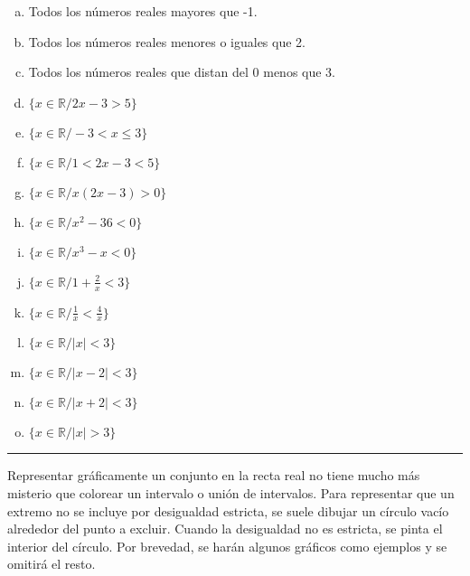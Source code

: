 \documentclass{article}
\begin{document}
\begin{enumerate}[(a)]

\bfseries

\item Todos los números reales mayores que -1.

\item Todos los números reales menores o iguales que 2.

\item Todos los números reales que distan del 0 menos que 3.

\item $ \{ x \in \mathbb{R} / 2x - 3 > 5 \} $

\item $ \{ x \in \mathbb{R} / -3 < x \leq 3 \} $

\item $ \{ x \in \mathbb{R} / 1 < 2x-3 < 5 \} $

\item $ \{ x \in \mathbb{R} / x(2x-3) > 0 \} $

\item $ \{ x \in \mathbb{R} / x^2 - 36 < 0 \} $

\item $ \{ x \in \mathbb{R} / x^3 - x < 0 \} $

\item $ \{ x \in \mathbb{R} / 1 + \frac{2}{x} < 3 \} $

\item $ \{ x \in \mathbb{R} / \frac{1}{x} < \frac{4}{x} \} $

\item $ \{ x \in \mathbb{R} / |x| < 3 \} $

\item $ \{ x \in \mathbb{R} / |x-2| < 3 \} $

\item $ \{ x \in \mathbb{R} / |x+2| < 3 \} $

\item $ \{ x \in \mathbb{R} / |x| > 3 \} $

\end{enumerate}
\hrule
\vspace{1em}

Representar gráficamente un conjunto en la recta real no tiene mucho más misterio que colorear un intervalo o unión de intervalos. Para representar que un extremo no se incluye por desigualdad estricta, se suele dibujar un círculo vacío alrededor del punto a excluir. Cuando la desigualdad no es estricta, se pinta el interior del círculo. Por brevedad, se harán algunos gráficos como ejemplos y se omitirá el resto.
\end{document}
